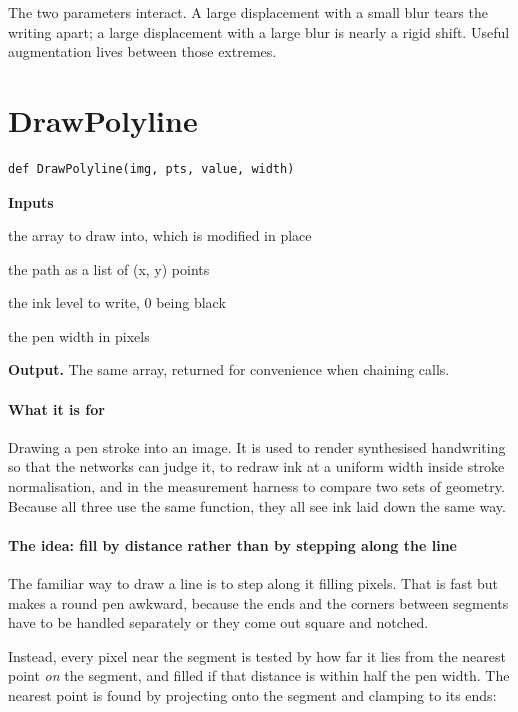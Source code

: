 The two parameters interact. A large displacement with a small blur tears the writing apart; a large displacement with a large blur is nearly a rigid shift. Useful augmentation lives between those extremes.


\section{DrawPolyline}
\begin{lstlisting}[style=sig]
def DrawPolyline(img, pts, value, width)
\end{lstlisting}

\noindent\textbf{Inputs}
\begin{description}[leftmargin=2.2em,style=nextline,font=\normalfont\ttfamily]\setlength\itemsep{1pt}
  \item[{img}] \normalfont the array to draw into, which is modified in place
  \item[{pts}] \normalfont the path as a list of (x, y) points
  \item[{value}] \normalfont the ink level to write, 0 being black
  \item[{width}] \normalfont the pen width in pixels
\end{description}

\noindent\textbf{Output.} The same array, returned for convenience when chaining calls.


\paragraph{What it is for}
Drawing a pen stroke into an image. It is used to render synthesised handwriting so that the networks can judge it, to redraw ink at a uniform width inside stroke normalisation, and in the measurement harness to compare two sets of geometry. Because all three use the same function, they all see ink laid down the same way.


\paragraph{The idea: fill by distance rather than by stepping along the line}
The familiar way to draw a line is to step along it filling pixels. That is fast but makes a round pen awkward, because the ends and the corners between segments have to be handled separately or they come out square and notched.

Instead, every pixel near the segment is tested by how far it lies from the nearest point \emph{on} the segment, and filled if that distance is within half the pen width. The nearest point is found by projecting onto the segment and clamping to its ends:


